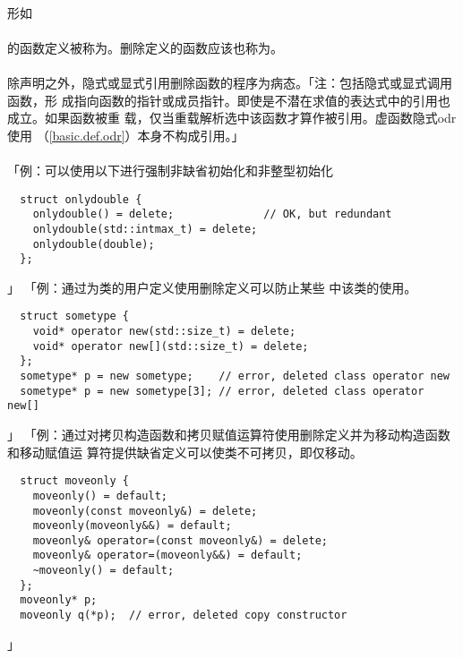 \paragraph{}
形如                                                                          \\
\mbox{\qquad{} }                   \\
的函数定义被称为。删除定义的函数应该也称为。

\paragraph{}
除声明之外，隐式或显式引用删除函数的程序为病态。「注：包括隐式或显式调用函数，形
成指向函数的指针或成员指针。即使是不潜在求值的表达式中的引用也成立。如果函数被重
载，仅当重载解析选中该函数才算作被引用。虚函数隐式odr使用
（\ref{basic.def.odr}）本身不构成引用。」

\paragraph{}
「例：可以使用以下进行强制非缺省初始化和非整型初始化
\begin{lstlisting}
  struct onlydouble {
    onlydouble() = delete;              // OK, but redundant
    onlydouble(std::intmax_t) = delete;
    onlydouble(double);
  };
\end{lstlisting}」
「例：通过为类的用户定义使用删除定义可以防止某些
中该类的使用。
\begin{lstlisting}
  struct sometype {
    void* operator new(std::size_t) = delete;
    void* operator new[](std::size_t) = delete;
  };
  sometype* p = new sometype;    // error, deleted class operator new
  sometype* p = new sometype[3]; // error, deleted class operator new[]
\end{lstlisting}」
「例：通过对拷贝构造函数和拷贝赋值运算符使用删除定义并为移动构造函数和移动赋值运
算符提供缺省定义可以使类不可拷贝，即仅移动。
\begin{lstlisting}
  struct moveonly {
    moveonly() = default;
    moveonly(const moveonly&) = delete;
    moveonly(moveonly&&) = default;
    moveonly& operator=(const moveonly&) = delete;
    moveonly& operator=(moveonly&&) = default;
    ~moveonly() = default;
  };
  moveonly* p;
  moveonly q(*p);  // error, deleted copy constructor
\end{lstlisting}」

